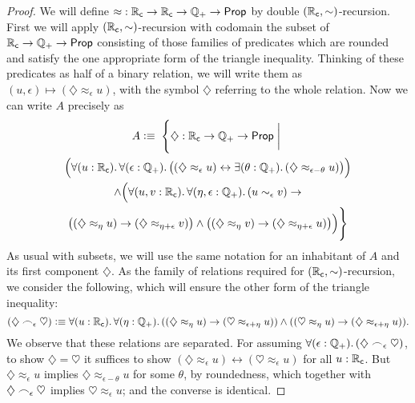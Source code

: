 \newcommand{\hapx}{\diamondsuit\approx}
\newcommand{\hapname}{\diamondsuit}
\newcommand{\hapxb}{\heartsuit\approx}
\newcommand{\hapbname}{\heartsuit}
\newcommand{\tap}[1]{\bullet\approx_{#1}\triangle}
\newcommand{\tapname}{\triangle}
\newcommand{\tapb}[1]{\bullet\approx_{#1}\square}
\newcommand{\tapbname}{\square}
\begin{proof}
  We will define $\mathord\approx:\mathbb{R}_\mathsf{c}\to\mathbb{R}_\mathsf{c}\to\mathbb{Q}_{+}\to\mathsf{Prop}$ by double $(\mathbb{R}_\mathsf{c},\sim)$-recursion.
  First we will apply $(\mathbb{R}_\mathsf{c},\sim)$-recursion with codomain the subset of $\mathbb{R}_\mathsf{c}\to\mathbb{Q}_{+}\to\mathsf{Prop}$ consisting of those families of predicates which are rounded and satisfy the one appropriate form of the triangle inequality.
  Thinking of these predicates as half of a binary relation, we will write them as $(u,\epsilon) \mapsto (\hapx_\epsilon u)$, with the symbol $\hapname$ referring to the whole relation.
  Now we can write $A$ precisely as
  \begin{multline*}
    A \defeq\; \Bigg\{ \hapname :\RC\to\Qp\to\prop \;\bigg|\; \\
    \Big(\fall{u:\RC}{\epsilon:\Qp}
    \big((\hapx_\epsilon u) \leftrightarrow \exis{\theta:\Qp} (\hapx_{\epsilon-\theta} u)\big)\Big)  \\
    \land \Big(\fall{u,v:\RC}{\eta,\epsilon:\Qp} (u\sim_\epsilon v) \to\\
    \big((\hapx_\eta u) \to (\hapx_{\eta+\epsilon} v) \big) \land \big((\hapx_\eta v) \to (\hapx_{\eta+\epsilon} u) \big)\Big)\Bigg\}
  \end{multline*}
  As usual with subsets, we will use the same notation for an inhabitant of $A$ and its first component $\hapname$.
  As the family of relations required for $(\mathbb{R}_\mathsf{c},\sim)$-recursion, we consider the following, which will ensure the other form of the triangle inequality:
  \begin{equation*}
    (\hapname \bsim_\epsilon \hapbname )
    \defeq \fall{u:\RC}{\eta:\Qp} ((\hapx_\eta u) \to (\hapxb_{\epsilon+\eta} u)) \land ((\hapxb_\eta u) \to (\hapx_{\epsilon+\eta} u)).
  \end{equation*}
  We observe that these relations are separated.
  For assuming $\fall{\epsilon:\Qp} (\hapname \bsim_\epsilon \hapbname)$, to show $\hapname = \hapbname$ it suffices to show $(\hapx_\epsilon u) \leftrightarrow (\hapxb_\epsilon u)$ for all $u:\mathbb{R}_\mathsf{c}$.
  But $\hapx_\epsilon u$ implies $\hapx_{\epsilon-\theta} u$ for some $\theta$, by roundedness, which together with $\hapname \bsim_\epsilon \hapbname$ implies $\hapxb_\epsilon u$; and the converse is identical.


\end{proof}
